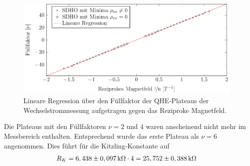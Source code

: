 \begin{figure}[h]
	\centering
	\includegraphics{graphs/ac/auswertung.pdf}
	\caption[Lineare Regression Wechselstrommessung]{
		Lineare Regression über den Füllfaktor der QHE-Plateaus der Wechselstrommessung aufgetragen gegen das Reziproke Magnetfeld.
	}
	\label{fig:ac_sdho_ausw}
\end{figure}

Die Plateaus mit den Füllfaktoren $\nu=2$ und $4$ waren anscheinend nicht mehr im Messbereich enthalten. Entsprechend wurde das erste Plateau als $\nu=6$ angenommen. Dies führt für die Kitzling-Konstante auf
$$ R_K = \unit[6,438 \pm 0,097]{k \Omega} \cdot 4 = \unit[25,752\pm 0,388]{k \Omega} $$